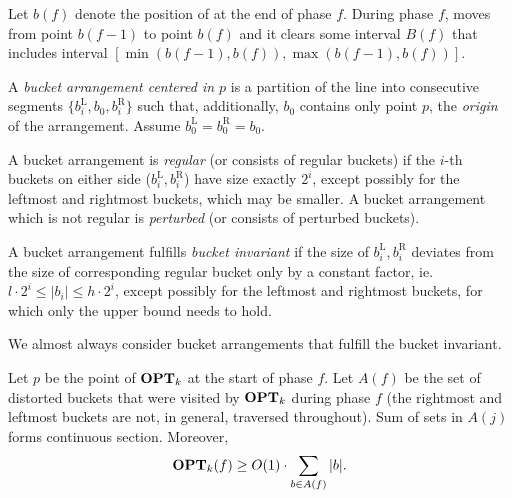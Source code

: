 Let $b(f)$ denote the position of \fazowy{} at the end of phase $f$. During
phase $f$, \fazowy{} moves from point $b(f-1)$ to point $b(f)$ and it clears
some interval $B(f)$ that includes interval $[\min(b(f-1), b(f)), \max(b(f-1),
b(f))]$.

\begin{definition}
A \emph{bucket arrangement centered in $p$} is a partition of the line into
consecutive segments $\{b_i^\text{L},b_0,b_i^\text{R}\}$ such that,
additionally, $b_0$ contains only point $p$, the \emph{origin} of the
arrangement. Assume $b_0^\text{L}=b_0^\text{R}=b_0$.

A bucket arrangement is \emph{regular} (or consists of regular buckets) if the
$i$-th buckets on either side ($b_i^\text{L},b_i^\text{R}$) have size exactly
$2^i$, except possibly for the leftmost and rightmost buckets, which may be
smaller. A bucket arrangement which is not regular is \emph{perturbed} (or
consists of perturbed buckets).

A bucket arrangement fulfills \emph{bucket invariant} if the size of
$b_i^\text{L},b_i^\text{R}$ deviates from the size of corresponding regular
bucket only by a constant factor, ie.\ $l\cdot2^i\leq|b_i|\leq
h\cdot2^i$, except possibly for the leftmost and
rightmost buckets, for which only the upper bound needs to hold.
%
%
\end{definition}

We almost always consider bucket arrangements that fulfill the bucket invariant.

\begin{observe}
Let $p$ be the point of $\operatorname{\mathbf{OPT}}_k$ at the start of phase $f$. Let $A(f)$ be the
set of distorted buckets that were visited by $\operatorname{\mathbf{OPT}}_k$ during phase $f$ (the
rightmost and leftmost buckets are not, in general, traversed throughout). Sum
of sets in $A(j)$ forms continuous section. Moreover,
\[\operatorname{\mathbf{OPT}}_k(f) \geq O(1) \cdot \sum_{b \in A(f)} |b|.\]
\end{observe}

